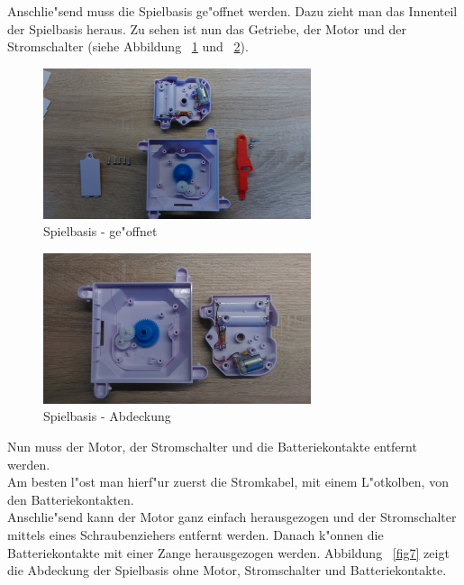 Anschlie"send muss die Spielbasis ge"offnet werden. Dazu zieht man das Innenteil der Spielbasis heraus.
Zu sehen ist nun das Getriebe, der Motor und der Stromschalter (siehe Abbildung ~\ref{fig4} und ~\ref{fig5}). 

\vspace{0.5cm}
\begin{figure}[!ht]
	\centering
  	\includegraphics[width=0.7\textwidth]{pictures/loolou_004.jpg}
	\caption{Spielbasis - ge"offnet}
	\label{fig4}
\end{figure}
\vspace{0.5cm}
\begin{figure}[!ht]
	\centering
  	\includegraphics[width=0.7\textwidth]{pictures/loolou_005.jpg}
	\caption{Spielbasis - Abdeckung}
	\label{fig5}
\end{figure}
\vspace{0.5cm}


Nun muss der Motor, der Stromschalter und die Batteriekontakte entfernt werden. \\
Am besten l"ost man hierf"ur zuerst die Stromkabel, mit einem L"otkolben, von den Batteriekontakten. \\
Anschlie"send kann der Motor ganz einfach herausgezogen und der Stromschalter mittels eines Schraubenziehers entfernt werden.
Danach k"onnen die Batteriekontakte mit einer Zange herausgezogen werden.
Abbildung ~\ref{fig7} zeigt die Abdeckung der Spielbasis ohne Motor, Stromschalter und Batteriekontakte.

